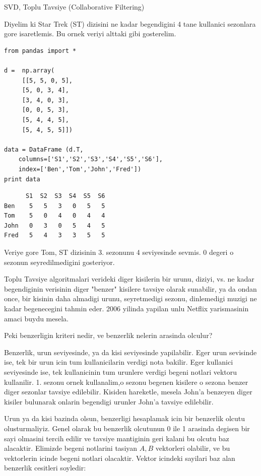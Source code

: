 \documentclass[12pt,fleqn]{article}\usepackage{../common}
\begin{document}
SVD, Toplu Tavsiye (Collaborative Filtering) 

Diyelim ki Star Trek (ST) dizisini ne kadar begendigini 4 tane
kullanici sezonlara gore isaretlemis. Bu ornek veriyi alttaki gibi
gosterelim.

\begin{verbatim}
from pandas import *

d =  np.array(
     [[5, 5, 0, 5],
     [5, 0, 3, 4],
     [3, 4, 0, 3],
     [0, 0, 5, 3],
     [5, 4, 4, 5],
     [5, 4, 5, 5]])

data = DataFrame (d.T,
    columns=['S1','S2','S3','S4','S5','S6'],
    index=['Ben','Tom','John','Fred'])
print data
\end{verbatim}

\begin{verbatim}
      S1  S2  S3  S4  S5  S6
Ben    5   5   3   0   5   5
Tom    5   0   4   0   4   4
John   0   3   0   5   4   5
Fred   5   4   3   3   5   5
\end{verbatim}

Veriye gore Tom, ST dizisinin 3. sezonunu 4 seviyesinde sevmis. 0
degeri o sezonun seyredilmedigini gosteriyor.

Toplu Tavsiye algoritmalari verideki diger kisilerin bir urunu, diziyi,
vs. ne kadar begendiginin verisinin diger "benzer" kisilere tavsiye olarak
sunabilir, ya da ondan once, bir kisinin daha almadigi urunu, seyretmedigi
sezonu, dinlemedigi muzigi ne kadar begenecegini tahmin eder. 2006 yilinda
yapilan unlu Netflix yarismasinin amaci buydu mesela. 

Peki benzerligin kriteri nedir, ve benzerlik nelerin arasinda olculur?

Benzerlik, urun seviyesinde, ya da kisi seviyesinde yapilabilir. Eger urun
sevisinde ise, tek bir urun icin tum kullanicilarin verdigi nota
bakilir. Eger kullanici seviyesinde ise, tek kullanicinin tum urunlere
verdigi begeni notlari vektoru kullanilir. 1. sezonu ornek kullanalim,o
sezonu begenen kisilere o sezona benzer diger sezonlar tavsiye
edilebilir. Kisiden hareketle, mesela John'a benzeyen diger kisiler
bulunarak onlarin begendigi urunler John'a tavsiye edilebilir.

Urun ya da kisi bazinda olsun, benzerligi hesaplamak icin bir benzerlik
olcutu olusturmaliyiz. Genel olarak bu benzerlik olcutunun 0 ile 1 arasinda
degisen bir sayi olmasini tercih edilir ve tavsiye mantiginin geri kalani
bu olcutu baz alacaktir. Elimizde begeni notlarini tasiyan $A,B$ vektorleri
olabilir, ve bu vektorlerin icinde begeni notlari olacaktir. Vektor
icindeki sayilari baz alan benzerlik cesitleri soyledir:
\end{document}

